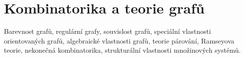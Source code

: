 \newpage
\section{Kombinatorika a teorie grafů}
\begin{pozadavky}
\begin{pitemize}
\item Barevnost grafů, regulární grafy, souvislost grafů, speciální vlastnosti orientovaných grafů, algebraické vlastnosti grafů, teorie párování, Ramseyova teorie, nekonečná kombinatorika, strukturální vlastnosti množinových systémů.
\end{pitemize}
\end{pozadavky}